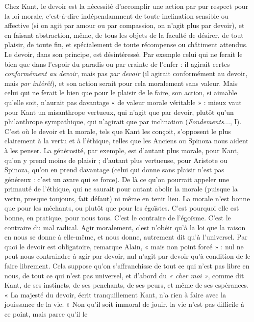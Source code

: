 Chez Kant, le devoir est la nécessité d’accomplir une action par pur respect
pour la loi morale, c’est-à-dire indépendamment de toute inclination sensible
ou affective (si on agit par amour ou par compassion, on n’agit plus par
devoir), et en faisant abstraction, même, de tous les objets de la faculté de
désirer, de tout plaisir, de toute fin, et spécialement de toute récompense ou
châtiment attendus. Le devoir, dans son principe, est désintéressé. Par exemple
celui qui ne ferait le bien que dans l'espoir du paradis ou par crainte de l’enfer :
il agirait certes {\it conformément au devoir}, mais pas {\it par devoir} (il agirait conformément
au devoir, mais {\it par intérêt}), et son action serait pour cela moralement
sans valeur. Mais celui qui ne ferait le bien que pour le plaisir de le faire, son
action, si aimable qu’elle soit, n'aurait pas davantage « de valeur morale
véritable » : mieux vaut pour Kant un misanthrope vertueux, qui n’agit que par
devoir, plutôt qu’un philanthrope sympathique, qui n’agirait que par inclination
({\it Fondements...}, I). C’est où le devoir et la morale, tels que Kant les
conçoit, s'opposent le plus clairement à la vertu et à l’éthique, telles que les
Anciens ou Spinoza nous aident à les penser. La générosité, par exemple, est
d’autant plus morale, pour Kant, qu’on y prend moins de plaisir ; d’autant plus
vertueuse, pour Aristote ou Spinoza, qu'on en prend davantage (celui qui
donne sans plaisir n’est pas généreux : c’est un avare qui se force). De là ce
qu’on pourrait appeler une primauté de l'éthique, qui ne saurait pour autant
abolir la morale (puisque la vertu, presque toujours, fait défaut) ni même en
tenir lieu. La morale n’est bonne que pour les méchants, ou plutôt que pour les
égoïstes. C’est pourquoi elle est bonne, en pratique, pour nous tous. C’est le
contraire de l’égoïsme. C’est le contraire du mal radical. Agir moralement, c’est
n’obéir qu’à la loi que la raison en nous se donne à elle-même, et nous donne,
autrement dit qu’à l’universel. Par quoi le devoir est obligatoire, remarque
Alain, « mais non point forcé » : nul ne peut nous contraindre à agir par devoir,
nul n’agit par devoir qu’à condition de le faire librement. Cela suppose qu’on
s’affranchisse de tout ce qui n’est pas libre en nous, de tout ce qui n’est pas universel,
et d’abord du {\it « cher moi »}, comme dit Kant, de ses instincts, de ses penchants,
de ses peurs, et même de ses espérances. « La majesté du devoir, écrit
tranquillement Kant, n’a rien à faire avec la jouissance de la vie. » Non qu'il
soit immoral de jouir, la vie n’est pas difficile à ce point, mais parce qu’il le
